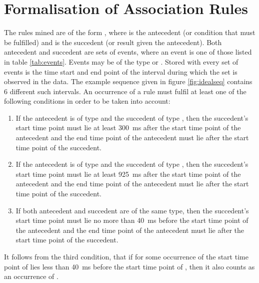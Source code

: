 
\chapter{Formalisation of Association Rules}
\label{ch:formalisation}

The rules mined are of the form , where  is the antecedent (or condition that must be fulfilled) and  is the succedent (or result given the antecedent). Both antecedent and succedent are sets of events, where an event is one of those listed in table \ref{tab:events}. Events may be of the type  or . Stored with every set of events is the time start and end point of the interval during which the set is observed in the data. The example sequence given in figure \ref{fig:idealseq} contains 6 different such intervals. An occurrence of a rule must fulfil at least one of the following conditions in order to be taken into account:
\begin{enumerate}
	\item If the antecedent is of type  and the succedent of type , then the succedent's start time point must lie at least 300~ms after the start time point of the antecedent and the end time point of the antecedent must lie after the start time point of the succedent.
	\item If the antecedent is of type  and the succedent of type , then the succedent's start time point must lie at least 925~ms after the start time point of the antecedent and the end time point of the antecedent must lie after the start time point of the succedent.
	\item If both antecedent and succedent are of the same type, then the succedent's start time point must lie no more than 40~ms before the start time point of the antecedent and the end time point of the antecedent must lie after the start time point of the succedent.
\end{enumerate}
It follows from the third condition, that if for some occurrence of  the start time point of  lies less than 40~ms before the start time point of , then it also counts as an occurrence of .